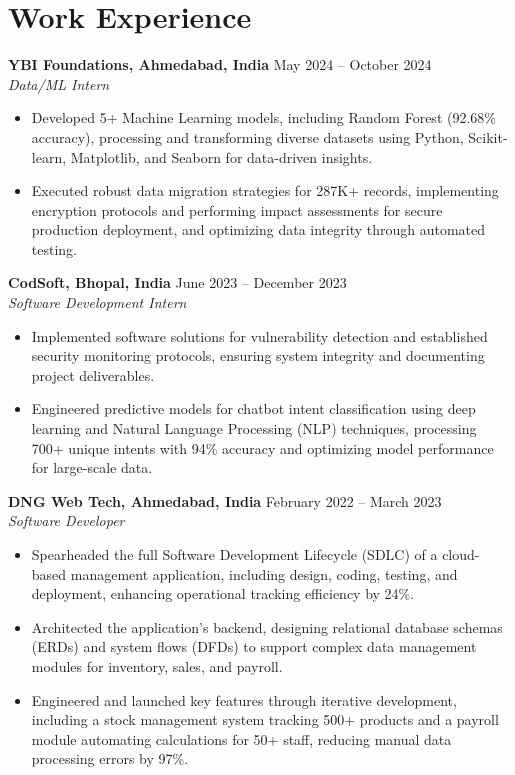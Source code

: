 \documentclass[a4paper,10pt]{article}
\begin{document}
\section*{Work Experience}
\textbf{YBI Foundations, Ahmedabad, India} \hfill May 2024 -- October 2024\\
\textit{Data/ML Intern} \\
\begin{itemize}[leftmargin=*, itemsep=0pt, parsep=1pt]
\vspace{-6mm}
\item Developed 5+ Machine Learning models, including Random Forest (92.68\% accuracy), processing and transforming diverse datasets using Python, Scikit-learn, Matplotlib, and Seaborn for data-driven insights.
\item Executed robust data migration strategies for 287K+ records, implementing encryption protocols and performing impact assessments for secure production deployment, and optimizing data integrity through automated testing.
\end{itemize}
\textbf{CodSoft, Bhopal, India} \hfill June 2023 -- December 2023\\
\textit{Software Development Intern} \\
\begin{itemize}[leftmargin=*, itemsep=0pt, parsep=1pt]
\vspace{-6mm}
\item Implemented software solutions for vulnerability detection and established security monitoring protocols, ensuring system integrity and documenting project deliverables.
\item Engineered predictive models for chatbot intent classification using deep learning and Natural Language Processing (NLP) techniques, processing 700+ unique intents with 94\% accuracy and optimizing model performance for large-scale data.
\vspace{-1mm}
\end{itemize}

\textbf{DNG Web Tech, Ahmedabad, India} \hfill February 2022 -- March 2023 \\
\textit{Software Developer} \\

\begin{itemize}[leftmargin=*, itemsep=0pt, parsep=1pt] %
\vspace{-7mm}
    \item Spearheaded the full Software Development Lifecycle (SDLC) of a cloud-based management application, including design, coding, testing, and deployment, enhancing operational tracking efficiency by 24\%.
\item Architected the application's backend, designing relational database schemas (ERDs) and system flows (DFDs) to support complex data management modules for inventory, sales, and payroll.
\item Engineered and launched key features through iterative development, including a stock management system tracking 500+ products and a payroll module automating calculations for 50+ staff, reducing manual data processing errors by 97\%. 

\end{itemize}
\end{document}
